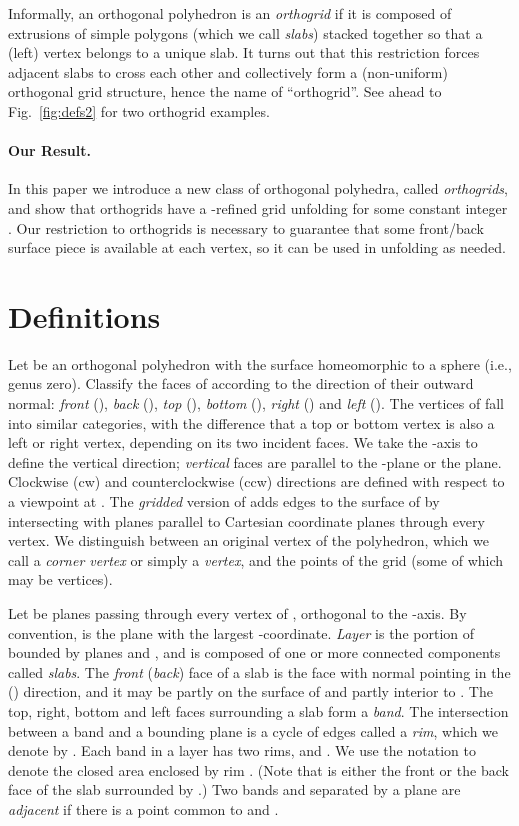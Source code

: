 \documentclass[11pt]{article}
\begin{document}
Informally, an orthogonal polyhedron  is an \emph{orthogrid} if it is composed of extrusions of simple polygons (which we call \emph{slabs}) stacked together so that a (left) vertex belongs to a unique slab. It turns out that this restriction forces adjacent slabs to cross each other and collectively form a (non-uniform) orthogonal grid structure, hence the name of ``orthogrid''. See ahead to Fig.~\ref{fig:defs2} for two orthogrid examples. 

\paragraph{Our Result.}  In this paper we introduce a new class of orthogonal polyhedra, called \emph{orthogrids}, and show that orthogrids have a -refined grid unfolding for some constant integer . Our restriction to orthogrids is necessary to guarantee that some front/back surface piece is available at each vertex, so it can be used in unfolding as needed. 

\section{Definitions}
Let  be an orthogonal polyhedron with the surface homeomorphic to a sphere (i.e., genus zero).
Classify the faces of  according to the direction of their outward normal:
\emph{front} (), \emph{back} (), \emph{top} (),
\emph{bottom} (), \emph{right} () and \emph{left} (). 
The vertices of  fall into similar categories, with the difference 
that a top or bottom vertex is also a left or right vertex, depending on its two incident faces. 
We take the -axis
to define the vertical direction; \emph{vertical} faces are parallel to the -plane
or the  plane.  Clockwise (cw) and counterclockwise (ccw) directions are defined with
respect to a viewpoint at . 
The \emph{gridded} version of  adds edges to the surface of  by
intersecting  with planes parallel to Cartesian coordinate planes
through every vertex. We distinguish between an original vertex of the polyhedron,
which we call a \emph{corner vertex} or simply a \emph{vertex}, and the points of the grid (some of which may be vertices). 


Let  be planes passing through every vertex of ,
orthogonal to the -axis. By convention,  is the plane with the
largest -coordinate.
\emph{Layer}  is the portion of  bounded by planes 
and , and is composed of one or more connected
components called \emph{slabs}.
The \emph{front} (\emph{back}) face of a slab is the face with normal pointing
in the  () direction, and it may be partly on the surface of  and partly
interior to . The top, right, bottom and left faces surrounding a slab form
a \emph{band}. The intersection between a band
 and a bounding plane  is a cycle of edges called a \emph{rim},
which we denote by .
Each band  in a layer  has two rims,  and .
We use the notation 
 to denote the closed area enclosed by rim . 
(Note that  is either the front or the back face of the slab surrounded by .)
Two bands  and  separated by a plane  are \emph{adjacent} if there is a point common to  and .
\end{document}
